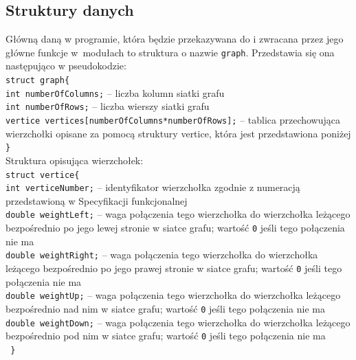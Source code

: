 \documentclass{article}
\begin{document}
\subsection{Struktury danych} 
Główną daną w programie, która będzie przekazywana do i zwracana przez jego główne funkcje w~modułach to struktura o nazwie \texttt{graph}. Przedstawia się ona następująco w pseudokodzie:\\
\texttt{struct graph\{} \\
\texttt{int numberOfColumns;} -- liczba kolumn siatki grafu\\
\texttt{int numberOfRows;} -- liczba wierszy siatki grafu\\
\texttt{vertice vertices[numberOfColumns*numberOfRows];} -- tablica przechowująca wierzchołki opisane za pomocą struktury vertice, która jest przedstawiona poniżej\\
\texttt{\}} \\
Struktura opisująca wierzchołek: \\
\texttt{struct vertice\{ } \\
\texttt{int verticeNumber;} -- identyfikator wierzchołka zgodnie z numeracją przedstawioną w Specyfikacji funkcjonalnej \\
\texttt{double weightLeft;} -- waga połączenia tego wierzchołka do wierzchołka leżącego bezpośrednio po jego lewej stronie w siatce grafu; wartość \texttt{0} jeśli tego połączenia nie ma \\
\texttt{double weightRight;} -- waga połączenia tego wierzchołka do wierzchołka leżącego bezpośrednio po jego prawej stronie w siatce grafu; wartość \texttt{0} jeśli tego połączenia nie ma \\
\texttt{double weightUp;} -- waga połączenia tego wierzchołka do wierzchołka leżącego bezpośrednio nad nim w siatce grafu; wartość \texttt{0} jeśli tego połączenia nie ma \\
\texttt{double weightDown;} -- waga połączenia tego wierzchołka do wierzchołka leżącego bezpośrednio pod nim w siatce grafu; wartość \texttt{0} jeśli tego połączenia nie ma \\
\texttt{ \} } \\
\end{document}
